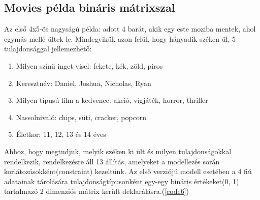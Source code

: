 \documentclass[12pt,a4paper]{report}
\begin{document}
\subsection{Movies példa bináris mátrixszal}

    Az első 4x5-ös nagyságú példa: adott 4 barát, akik egy este moziba mentek, ahol egymás mellé ültek le.
    Mindegyikük azon felül, hogy hányadik széken ül, 5 tulajdonsággal jellemezhető:
    \begin{enumerate}
    	\item Milyen színű inget visel: fekete, kék, zöld, piros
    	\item Keresztnév: Daniel, Joshua, Nicholas, Ryan
    	\item Milyen típusú film a kedvence: akció, vígjáték, horror, thriller
    	\item Nassolnivaló: chips, süti, cracker, popcorn
    	\item Életkor: 11, 12, 13 és 14 éves
    \end{enumerate}
    Ahhoz, hogy megtudjuk, melyik széken ki ült és milyen tulajdonságokkal rendelkezik, rendelkezésre áll 13 állítás, amelyeket a modellezés során korlátozásokként(constraint) kezeltünk.
    Az első verziójú modell esetében a 4 fiú adatainak tárolására tulajdonságtípusonként egy-egy bináris értékeket(0, 1) tartalmazó 2 dimenziós mátrix került deklarálásra.(\ref{code6})

    
\end{document}
